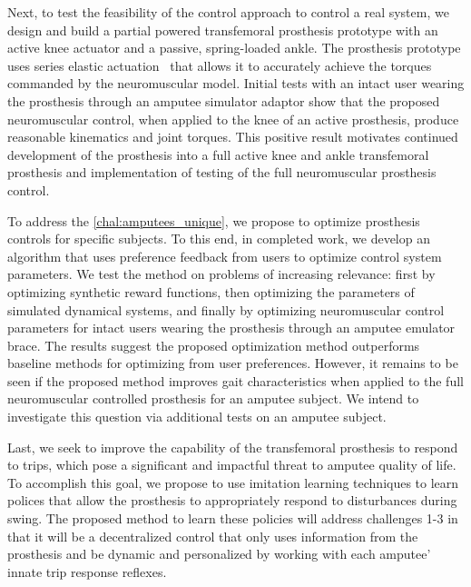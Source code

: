 Next, to test the feasibility of the control approach to control a real system,
we design and build a partial powered transfemoral prosthesis prototype with an
active knee actuator and a passive, spring-loaded ankle. The prosthesis
prototype uses series elastic actuation~\citep{pratt1995series} that allows it
to accurately achieve the torques commanded by the neuromuscular model. Initial
tests with an intact user wearing the prosthesis through an amputee simulator
adaptor show that the proposed neuromuscular control, when applied to the knee
of an active prosthesis, produce reasonable kinematics and joint torques. This
positive result motivates continued development of the prosthesis into a full
active knee and ankle transfemoral prosthesis and implementation of testing of
the full neuromuscular prosthesis control.

To address the \cref{chal:amputees_unique}, we propose to optimize prosthesis
controls for specific subjects. To this end, in completed work, we develop an
algorithm that uses preference feedback from users to optimize control system
parameters. We test the method on problems of increasing relevance: first by
optimizing synthetic reward functions, then optimizing the parameters of
simulated dynamical systems, and finally by optimizing neuromuscular control
parameters for intact users wearing the prosthesis through an amputee emulator
brace. The results suggest the proposed optimization method outperforms baseline
methods for optimizing from user preferences. However, it remains to be seen if
the proposed method improves gait characteristics when applied to the full
neuromuscular controlled prosthesis for an amputee subject. We intend to
investigate this question via additional tests on an amputee subject.

Last, we seek to improve the capability of the transfemoral prosthesis to
respond to trips, which pose a significant and impactful threat to amputee
quality of life. To accomplish this goal, we propose to use imitation learning
techniques \citep{argall2009survey} to learn polices that allow the prosthesis
to appropriately respond to disturbances during swing.  The proposed method to
learn these policies will address challenges 1-3 in that it will be a
decentralized control that only uses information from the prosthesis and be
dynamic and personalized by working with each amputee' innate trip response
reflexes.

